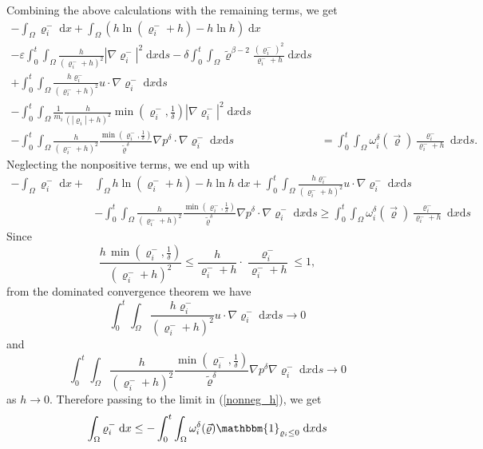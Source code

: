 \documentclass[11pt]{article}
\newcommand{\dd}{\mathrm{d}}
\numberwithin{equation}{section}
\numberwithin{tw}{section}
\begin{document}
Combining the above calculations with the remaining terms, we get
\[\begin{aligned}
    -\int_\Omega \varrho_i^-\;\dd x + \int_\Omega (h\ln(\varrho_i^-+h)-h\ln h)\;\dd x \\
    -\varepsilon\int_0^t\int_\Omega \frac{h}{(\varrho_i^-+h)^2}|\nabla\varrho_i^-|^2\;\dd x\dd s -\delta\int_0^t\int_\Omega \tilde\varrho^{\beta-2}\frac{(\varrho_i^-)^2}{\varrho_i^-+h}\;\dd x\dd s \\
    +\int_0^t\int_\Omega \frac{h\varrho_i^-}{(\varrho_i^-+h)^2}u\cdot\nabla\varrho_i^- \;\dd x\dd s \\
    -\int_0^t\int_\Omega \frac{1}{m_i}\frac{h}{(|\varrho_i|+h)^2}\min(\varrho_i^-,\frac{1}{\delta})|\nabla\varrho_i^-|^2\;\dd x\dd s \\
    -\int_0^t\int_\Omega \frac{h}{(\varrho_i^-+h)^2}\frac{\min(\varrho_i^-,\frac{1}{\delta})}{\tilde\varrho^\delta}\nabla p^\delta\cdot\nabla\varrho_i^-\;\dd x\dd s &= \int_0^t\int_\Omega \omega_i^\delta(\vec\varrho)\frac{\varrho_i^-}{\varrho_i^-+h} \;\dd x\dd s.
\end{aligned}\]
Neglecting the nonpositive terms, we end up with
\begin{equation}\label{nonneg_h}
\begin{aligned}
    -\int_\Omega \varrho_i^-\;\dd x + & \int_\Omega h\ln(\varrho_i^-+h)- h\ln h\;\dd x + \int_0^t\int_\Omega \frac{h\varrho_i^-}{(\varrho_i^-+h)^2}u\cdot\nabla\varrho_i^-\;\dd x\dd s \\
    &-\int_0^t\int_\Omega \frac{h}{(\varrho_i^-+h)^2}\frac{\min(\varrho_i^-,\frac{1}{\delta})}{\tilde\varrho^\delta}\nabla p^\delta\cdot\nabla\varrho_i^-\;\dd x\dd s \geq \int_0^t\int_\Omega \omega_i^\delta(\vec\varrho)\frac{\varrho_i^-}{\varrho_i^-+h}\;\dd x\dd s
\end{aligned}\end{equation}
Since 
\[ \frac{h\,\min(\varrho_i^-,\frac{1}{\delta})}{(\varrho_i^-+h)^2} \leq \frac{h}{\varrho_i^-+h}\cdot\frac{\varrho_i^-}{\varrho_i^-+h}\leq 1, \]
from the dominated convergence theorem we have
\[ \int_0^t\int_\Omega \frac{h\varrho_i^-}{(\varrho_i^-+h)^2}u\cdot\nabla\varrho_i^-\;\dd x\dd s \to 0 \]
and
\[ \int_0^t\int_\Omega \frac{h}{(\varrho_i^-+h)^2}\frac{\min(\varrho_i^-,\frac{1}{\delta})}{\tilde\varrho^\delta}\nabla p^\delta\nabla\varrho_i^- \;\dd x\dd s \to 0 \]
as $h\to 0$. Therefore passing to the limit in (\ref{nonneg_h}), we get
\[ \int_\Omega \varrho_i^-\;\dd x \leq -\int_0^t\int_\Omega \omega_i^\delta(\vec\varrho)\mathbbm{1}_{\varrho_i\leq 0} \;\dd x\dd s \]
\end{document}
